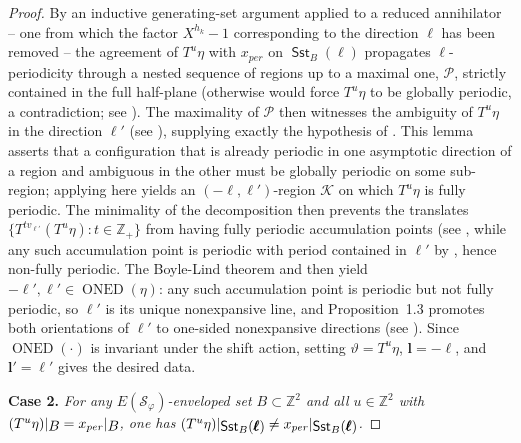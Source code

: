 \documentclass[12pt]{amsart}
\numberwithin{equation}{section}
\DeclareMathOperator{\nexpd}{ONED}
\DeclareMathOperator{\sst}{\mathsf{Sst}}
\newcommand{\bb}[1]{\mathbb{#1}}
\newcommand{\sob}[1]{\ensuremath{{\mathbin |}\raise-.4ex\hbox{$#1$}}}
\begin{document}
\begin{proof}
By an inductive generating-set argument applied to a reduced annihilator -- one from which the factor $ X^{h_k} - 1 $ corresponding to the direction $ \pmb{\ell} $ has been removed -- the agreement of $ T^u \eta $ with $ x_{per} $ on $ \sst_B(\pmb{\ell}) $ propagates $\ell$-periodicity through a nested sequence of regions up to a maximal one, $ \mathcal P $, strictly contained in the full half-plane (otherwise \cite[Proposition~2.14]{Colle23} would force $ T^u \eta $ to be globally periodic, a contradiction; see \cite[Claim~4.7]{Colle23}). The maximality of $ \mathcal P $ then witnesses the ambiguity of $ T^u \eta $ in the direction $ \pmb{\ell}' $ (see \cite[Claim~4.8]{Colle23}), supplying exactly the hypothesis of \cite[Lemma~4.2]{Colle23}. This lemma asserts that a configuration that is already periodic in one asymptotic direction of a region and ambiguous in the other must be globally periodic on some sub-region; applying \cite[Lemma~4.2]{Colle23} here yields an $(-\pmb{\ell},\pmb{\ell}')$-region $ \mathcal K $ on which $T^{u}\eta$ is fully periodic. The minimality of the decomposition then prevents the translates $ \{T^{t v_{\pmb{\ell}'}}(T^u\eta) : t \in \mathbb Z_+ \} $ from having fully periodic accumulation points (see \cite[Claim~4.9]{Colle23}, while any such accumulation point is periodic with period contained in $\ell'$ by \cite[Proposition~2.14]{Colle23}, hence non-fully periodic. The Boyle-Lind theorem and \cite[Proposition~1.3]{Colle23} then yield $-\pmb{\ell}', \pmb{\ell}' \in \nexpd(\eta)$: any such
accumulation point is periodic but not fully periodic, so $\ell'$ is its unique nonexpansive line, and Proposition~1.3 promotes both orientations of $\ell'$ to one-sided nonexpansive directions (see \cite[Claim~4.10]{Colle23}). Since $\nexpd( \cdot )$ is invariant under the shift action, setting $\vartheta = T^{u}\eta$, $\pmb{l} = -\pmb{\ell}$, and $\pmb{l}' = \pmb{\ell}'$ gives the desired data.

\medskip\noindent
\textbf{Case 2.} \textit{For any $E(\mathcal{S}_{\varphi})$-enveloped set $B \subset \bb{Z}^2$ and all $u \in \bb{Z}^2$ with $(T^{u}\eta)\sob{B} = x_{per}\sob{B}$, one has $(T^{u}\eta)\sob{\sst_B(\pmb{\ell})} \neq x_{per}\sob{\sst_B(\pmb{\ell})}$.}

\medskip


\end{proof}
\end{document}
